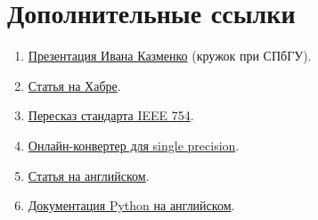 \section{Дополнительные ссылки}

\begin{frame}
	\begin{enumerate}
		\item \href{http://acm.math.spbu.ru/~gassa/slides/number-representation.ru.pdf}{Презентация Ивана Казменко} (кружок при СПбГУ).
		\item \href{https://habrahabr.ru/post/112953/}{Статья на Хабре}.
		\item \href{http://www.softelectro.ru/ieee754.html}{Пересказ стандарта IEEE 754}.
		\item \href{https://www.h-schmidt.net/FloatConverter/IEEE754.html}{Онлайн-конвертер для single precision}.
		\item \href{http://steve.hollasch.net/cgindex/coding/ieeefloat.html}{Статья на английском}.
		\item \href{https://docs.python.org/3/tutorial/floatingpoint.html}{Документация Python на английском}.
	\end{enumerate}
\end{frame}
